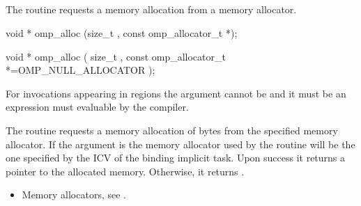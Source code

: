 \vspace{3\baselineskip}
\begin{ccppspecific}
\vspace{-3\baselineskip}
\subsection{}
\label{subsec:omp_alloc}

\summary
The  routine requests a memory allocation from a memory allocator.

\format
\begin{cspecific}
\begin{ompcFunction}
void * omp_alloc (size_t , const omp_allocator_t *);
\end{ompcFunction}
\end{cspecific}
\begin{cppspecific}
\begin{ompcFunction}
void * omp_alloc (
  size_t ,
  const omp_allocator_t *=OMP_NULL_ALLOCATOR
);
\end{ompcFunction}
\end{cppspecific}

\constraints

For  invocations appearing in  regions the  argument cannot be  and it must be an expression must evaluable by the compiler.

\effect

The  routine requests a memory allocation of  bytes from the specified memory allocator. If the  argument is
 the memory allocator used by the routine will be the one specified by the  ICV of the binding implicit task.
Upon success it returns a pointer to the allocated memory. Otherwise, it returns .

\crossreferences
\begin{itemize}
\item Memory allocators, see .
\end{itemize}

\subsection{}
\label{subsec:omp_free}


\end{ccppspecific}
